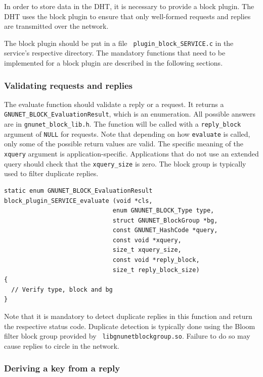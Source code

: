 \documentclass[10pt]{article}
\begin{document}
In order to store data in the DHT, it is necessary to provide a block
plugin.  The DHT uses the block plugin to ensure that only well-formed
requests and replies are transmitted over the network.

The block plugin should be put in a file {\tt
  plugin\_block\_SERVICE.c} in the service's respective directory. The
mandatory functions that need to be implemented for a block plugin are
described in the following sections.

\subsubsection{Validating requests and replies}

The evaluate function should validate a reply or a request. It returns
a {\tt GNUNET\_BLOCK\_EvaluationResult}, which is an enumeration. All
possible answers are in {\tt gnunet\_block\_lib.h}.  The function will
be called with a {\tt reply\_block} argument of {\tt NULL} for
requests.  Note that depending on how {\tt evaluate} is called, only
some of the possible return values are valid.  The specific meaning of
the {\tt xquery} argument is application-specific.  Applications that
do not use an extended query should check that the {\tt xquery\_size}
is zero.  The block group is typically used to filter duplicate
replies.

\lstset{language=C}
\begin{lstlisting}
static enum GNUNET_BLOCK_EvaluationResult
block_plugin_SERVICE_evaluate (void *cls,
                              enum GNUNET_BLOCK_Type type,
                              struct GNUNET_BlockGroup *bg,
                              const GNUNET_HashCode *query,
                              const void *xquery,
                              size_t xquery_size,
                              const void *reply_block,
                              size_t reply_block_size)
{
  // Verify type, block and bg
}
\end{lstlisting}

Note that it is mandatory to detect duplicate replies in this function
and return the respective status code.  Duplicate detection is
typically done using the Bloom filter block group provided by {\tt
  libgnunetblockgroup.so}.  Failure to do so may cause replies to
circle in the network.

\subsubsection{Deriving a key from a reply}
\end{document}
